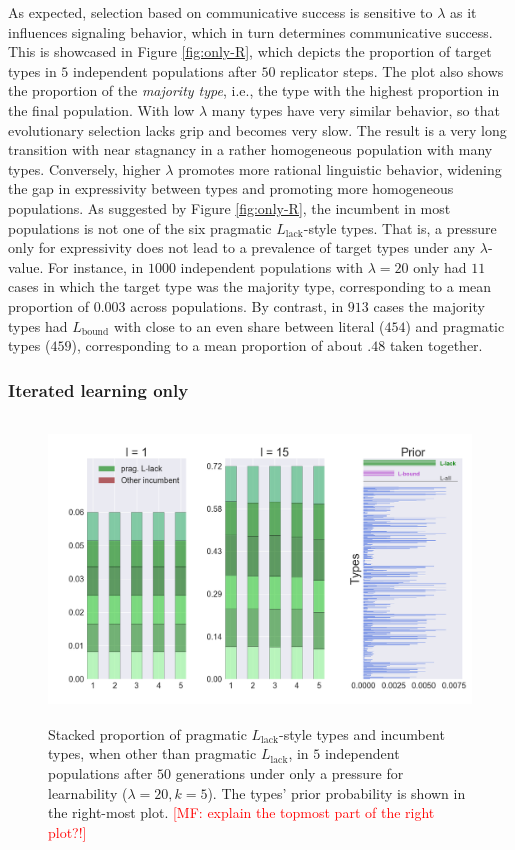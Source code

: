 \documentclass[a4paper, 11pt]{article}
\theoremstyle{Satz}
\newcommand{\mf}[1]{\textcolor{Red}{[MF: #1]}}
\newcommand{\mylang}[1]{\ensuremath{L_{\text{#1}}}\xspace} %
\newcommand{\Lbound}{\mylang{bound}}
\newcommand{\Llack}{\mylang{lack}}
\begin{document}
As expected, selection based on communicative success is sensitive to $\lambda$ as it
influences signaling behavior, which in turn determines communicative success. This is
showcased in Figure \ref{fig:only-R}, which depicts the proportion of target types in $5$
independent populations after $50$ replicator steps. The plot also shows the proportion of the
\emph{majority type}, i.e., the type with the highest proportion in the final population. With
low $\lambda$ many types have very similar behavior, so that evolutionary selection lacks grip
and becomes very slow. The result is a very long transition with near stagnancy in a rather
homogeneous population with many types. Conversely, higher $\lambda$ promotes more rational
linguistic behavior, widening the gap in expressivity between types and promoting more
homogeneous populations. As suggested by Figure \ref{fig:only-R}, the incumbent in most
populations is not one of the six pragmatic $\Llack$-style types. That is, a pressure only for
expressivity does not lead to a prevalence of target types under any $\lambda$-value. For
instance, in $1000$ independent populations with $\lambda = 20$ only had $11$ cases in which
the target type was the majority type, corresponding to a mean proportion of $0.003$ across
populations. By contrast, in $913$ cases the majority types had $\Lbound$ with close to an even
share between literal ($454$) and pragmatic types ($459$), corresponding to a mean proportion
of about $.48$ taken together.


\subsubsection{Iterated learning only}

\begin{figure}[t]
\centering
\includegraphics[width=1\textwidth,height=8cm,keepaspectratio]{./plots/fig2-onlym-pr}
\caption{Stacked proportion of pragmatic $\Llack$-style types and incumbent types, when other
  than pragmatic $\Llack$, in $5$ independent populations after $50$ generations under only a
  pressure for learnability ($\lambda = 20, k = 5$). The types' prior probability is shown in
  the right-most plot. \mf{explain the topmost part of the right plot?!}}
\label{fig:only-M}
\end{figure}
\end{document}
